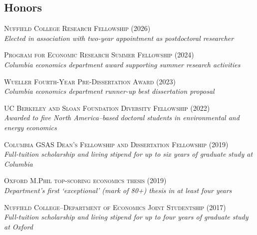 \documentclass[margin,line]{res}
\begin{document}
\begin{resume}
\section{\sc Honors}

{\textsc{Nuffield College Research Fellowship (2026)}}\\
\phantom{ }\textit{Elected in association with two-year appointment as postdoctoral researcher}
\vspace{-.3cm}

{\textsc{Program for Economic Research Summer Fellowship (2024)}}\\
\phantom{ }\textit{Columbia economics department award supporting summer research activities}
\vspace{-.3cm}

{\textsc{Wueller Fourth-Year Pre-Dissertation Award (2023)}}\\
\phantom{ }\textit{Columbia economics department runner-up best dissertation proposal}
\vspace{-.3cm}

{\textsc{UC Berkeley and Sloan Foundation Diversity Fellowship} (2022)}\\
\phantom{ }\textit{Awarded to five North America--based doctoral students in environmental and energy economics}
\vspace{-.3cm}

{\textsc{Columbia GSAS Dean's Fellowship and Dissertation Fellowship (2019)}}\\
\phantom{ }\textit{Full-tuition scholarship and living stipend for up to six years of graduate study at Columbia}
\vspace{-.3cm}

{\textsc{Oxford M.Phil top-scoring economics thesis (2019)}}\\
\phantom{ }\textit{Department's first `exceptional' (mark of 80+) thesis in at least four years}
\vspace{-.3cm}

{\textsc{Nuffield College--Department of Economics Joint Studentship (2017)}}\\
\phantom{ }\textit{Full-tuition scholarship and living stipend for up to four years of graduate study at Oxford}
\vspace{-.2cm}



\end{resume}
\end{document}
